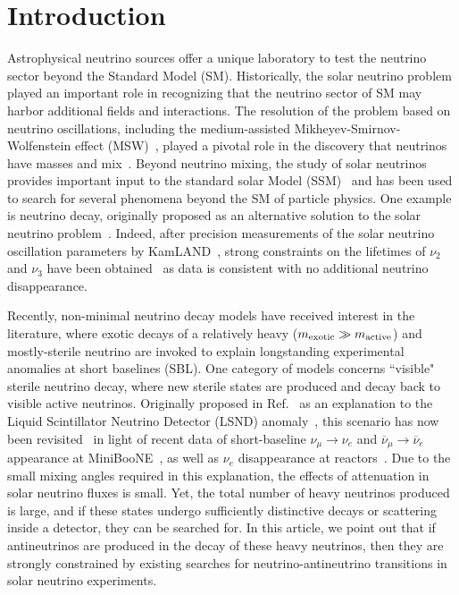 \documentclass[
reprint,
superscriptaddress,
showpacs,
preprintnumbers,
nofootinbib,
nobibnotes,
amsmath,
amssymb, 
aps,
prd,
floatfix
]{revtex4-1}
\begin{document}
\section{Introduction} 
Astrophysical neutrino sources offer a unique laboratory to test the neutrino sector beyond the Standard Model (SM). Historically, the solar neutrino problem played an important role in recognizing that the neutrino sector of SM may harbor additional fields and interactions. The resolution of the problem based on neutrino oscillations, including the medium-assisted Mikheyev-Smirnov-Wolfenstein effect (MSW)~\cite{Wolfenstein:1977ue,Mikheev:1986gs}, played a pivotal role in the discovery that neutrinos have masses and mix~\cite{Fukuda:1998mi,Ahmad:2002jz}.
Beyond neutrino mixing, the study of solar neutrinos provides important input to the standard solar Model (SSM)~\cite{Bahcall:2005va,Agostini:2020mfq} and has been used to search for several phenomena beyond the SM of particle physics. One example is neutrino decay, originally proposed as an alternative solution to the solar neutrino problem~\cite{Bahcall:1972my,Pakvasa:1972gz}. Indeed, after precision measurements of the solar neutrino oscillation parameters by KamLAND~\cite{Abe:2008aa}, strong constraints on the lifetimes of $\nu_2$ and $\nu_3$ have been obtained~\cite{Joshipura:2002fb,Beacom:2002cb} as data is consistent with no additional neutrino disappearance. 

Recently, non-minimal neutrino decay models have received interest in the literature, where exotic decays of a relatively heavy ($m_{\rm exotic} \gg m_{\rm active}$) and mostly-sterile neutrino are invoked to explain longstanding experimental anomalies at short baselines (SBL). One category of models concerns ``visible" sterile neutrino decay, where new sterile states are produced and decay back to visible active neutrinos. Originally proposed in Ref.~\cite{PalomaresRuiz:2005vf} as an explanation to the Liquid Scintillator Neutrino Detector (LSND) anomaly~\cite{Athanassopoulos:1996jb,Aguilar:2001ty}, this scenario has now been revisited~\cite{deGouvea:2019qre,Dentler:2019dhz} in light of recent data of short-baseline $\nu_\mu \to \nu_e$ and $\overline{\nu}_\mu \to \overline{\nu}_e$ appearance at MiniBooNE~\cite{AguilarArevalo:2007it,Aguilar-Arevalo:2018gpe,Aguilar-Arevalo:2020nvw}, as well as $\nu_e$ disappearance at reactors~\cite{Mention:2011rk,Dentler:2017tkw}. Due to the small mixing angles required in this explanation, the effects of attenuation in solar neutrino fluxes is small. Yet, the total number of heavy neutrinos produced is large, and if these states undergo sufficiently distinctive decays or scattering inside a detector, they can be searched for. In this article, we point out that if antineutrinos are produced in the decay of these heavy neutrinos, then they are strongly constrained by existing searches for neutrino-antineutrino transitions in solar neutrino experiments. 
\end{document}
